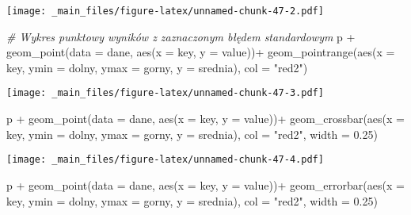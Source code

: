 \documentclass[
]{book}
\newenvironment{Shaded}{\begin{snugshade}}{\end{snugshade}}
\newcommand{\AttributeTok}[1]{\textcolor[rgb]{0.77,0.63,0.00}{#1}}
\newcommand{\CommentTok}[1]{\textcolor[rgb]{0.56,0.35,0.01}{\textit{#1}}}
\newcommand{\FloatTok}[1]{\textcolor[rgb]{0.00,0.00,0.81}{#1}}
\newcommand{\FunctionTok}[1]{\textcolor[rgb]{0.00,0.00,0.00}{#1}}
\newcommand{\NormalTok}[1]{#1}
\newcommand{\SpecialCharTok}[1]{\textcolor[rgb]{0.00,0.00,0.00}{#1}}
\newcommand{\StringTok}[1]{\textcolor[rgb]{0.31,0.60,0.02}{#1}}
\begin{document}
\texttt{[image: \_main\_files/figure-latex/unnamed-chunk-47-2.pdf]}

\begin{Shaded}
\begin{Highlighting}[]
\CommentTok{\# Wykres punktowy wyników z zaznaczonym błędem standardowym}
\NormalTok{p }\SpecialCharTok{+} \FunctionTok{geom\_point}\NormalTok{(}\AttributeTok{data =}\NormalTok{ dane, }\FunctionTok{aes}\NormalTok{(}\AttributeTok{x =}\NormalTok{ key, }\AttributeTok{y =}\NormalTok{ value))}\SpecialCharTok{+}
  \FunctionTok{geom\_pointrange}\NormalTok{(}\FunctionTok{aes}\NormalTok{(}\AttributeTok{x =}\NormalTok{ key, }\AttributeTok{ymin =}\NormalTok{ dolny, }\AttributeTok{ymax =}\NormalTok{ gorny, }\AttributeTok{y =}\NormalTok{ srednia), }\AttributeTok{col =} \StringTok{"red2"}\NormalTok{)}
\end{Highlighting}
\end{Shaded}

\texttt{[image: \_main\_files/figure-latex/unnamed-chunk-47-3.pdf]}

\begin{Shaded}
\begin{Highlighting}[]
\NormalTok{p }\SpecialCharTok{+} \FunctionTok{geom\_point}\NormalTok{(}\AttributeTok{data =}\NormalTok{ dane, }\FunctionTok{aes}\NormalTok{(}\AttributeTok{x =}\NormalTok{ key, }\AttributeTok{y =}\NormalTok{ value))}\SpecialCharTok{+}
  \FunctionTok{geom\_crossbar}\NormalTok{(}\FunctionTok{aes}\NormalTok{(}\AttributeTok{x =}\NormalTok{ key, }\AttributeTok{ymin =}\NormalTok{ dolny, }\AttributeTok{ymax =}\NormalTok{ gorny, }\AttributeTok{y =}\NormalTok{ srednia), }\AttributeTok{col =} \StringTok{"red2"}\NormalTok{, }\AttributeTok{width =} \FloatTok{0.25}\NormalTok{)}
\end{Highlighting}
\end{Shaded}

\texttt{[image: \_main\_files/figure-latex/unnamed-chunk-47-4.pdf]}

\begin{Shaded}
\begin{Highlighting}[]
\NormalTok{p }\SpecialCharTok{+} \FunctionTok{geom\_point}\NormalTok{(}\AttributeTok{data =}\NormalTok{ dane, }\FunctionTok{aes}\NormalTok{(}\AttributeTok{x =}\NormalTok{ key, }\AttributeTok{y =}\NormalTok{ value))}\SpecialCharTok{+}
  \FunctionTok{geom\_errorbar}\NormalTok{(}\FunctionTok{aes}\NormalTok{(}\AttributeTok{x =}\NormalTok{ key, }\AttributeTok{ymin =}\NormalTok{ dolny, }\AttributeTok{ymax =}\NormalTok{ gorny, }\AttributeTok{y =}\NormalTok{ srednia), }\AttributeTok{col =} \StringTok{"red2"}\NormalTok{, }\AttributeTok{width =} \FloatTok{0.25}\NormalTok{)}
\end{Highlighting}
\end{Shaded}
\end{document}
